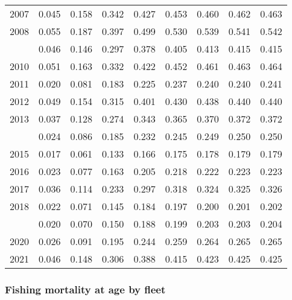\documentclass[
]{article}
\begin{document}
\begin{longtable}[t]{lrrrrrrrr}
2007 & 0.045 & 0.158 & 0.342 & 0.427 & 0.453 & 0.460 & 0.462 & 0.463\\
2008 & 0.055 & 0.187 & 0.397 & 0.499 & 0.530 & 0.539 & 0.541 & 0.542\\
\addlinespace
2009 & 0.046 & 0.146 & 0.297 & 0.378 & 0.405 & 0.413 & 0.415 & 0.415\\
2010 & 0.051 & 0.163 & 0.332 & 0.422 & 0.452 & 0.461 & 0.463 & 0.464\\
2011 & 0.020 & 0.081 & 0.183 & 0.225 & 0.237 & 0.240 & 0.240 & 0.241\\
2012 & 0.049 & 0.154 & 0.315 & 0.401 & 0.430 & 0.438 & 0.440 & 0.440\\
2013 & 0.037 & 0.128 & 0.274 & 0.343 & 0.365 & 0.370 & 0.372 & 0.372\\
\addlinespace
2014 & 0.024 & 0.086 & 0.185 & 0.232 & 0.245 & 0.249 & 0.250 & 0.250\\
2015 & 0.017 & 0.061 & 0.133 & 0.166 & 0.175 & 0.178 & 0.179 & 0.179\\
2016 & 0.023 & 0.077 & 0.163 & 0.205 & 0.218 & 0.222 & 0.223 & 0.223\\
2017 & 0.036 & 0.114 & 0.233 & 0.297 & 0.318 & 0.324 & 0.325 & 0.326\\
2018 & 0.022 & 0.071 & 0.145 & 0.184 & 0.197 & 0.200 & 0.201 & 0.202\\
\addlinespace
2019 & 0.020 & 0.070 & 0.150 & 0.188 & 0.199 & 0.203 & 0.203 & 0.204\\
2020 & 0.026 & 0.091 & 0.195 & 0.244 & 0.259 & 0.264 & 0.265 & 0.265\\
2021 & 0.046 & 0.148 & 0.306 & 0.388 & 0.415 & 0.423 & 0.425 & 0.425\\*
\end{longtable}

\hypertarget{fishing-mortality-at-age-by-fleet}{%
\subsubsection{Fishing mortality at age by
fleet}\label{fishing-mortality-at-age-by-fleet}}
\end{document}

